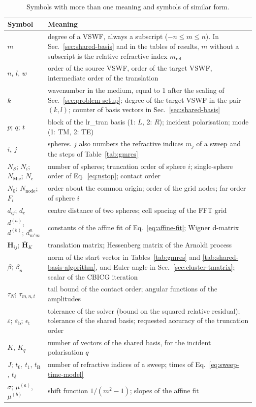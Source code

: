\documentclass[11pt,a4paper]{article}
\renewcommand{\arraystretch}{1.6}
\begin{document}
\begin{table}[htbp]
\caption{Symbols with more than one meaning and symbols of similar form.}
\label{tab:notation}
\centering
\renewcommand{\arraystretch}{1.15}
\begin{tabular}{@{} >{\raggedright\arraybackslash}p{3.6cm} >{\raggedright\arraybackslash}p{12.2cm} @{}}
\toprule
Symbol & Meaning \\
\midrule
$m$ & degree of a VSWF, always a subscript ($-n \leq m \leq n$). In Sec.~\ref{sec:shared-basis} and in the tables of results, $m$ without a subscript is the relative refractive index $m_\mathrm{rel}$ \\
$n$, $l$, $w$ & order of the source VSWF, order of the target VSWF, intermediate order of the translation \\
$k$ & wavenumber in the medium, equal to 1 after the scaling of Sec.~\ref{sec:problem-setup}; degree of the target VSWF in the pair $(k, l)$; counter of basis vectors in Sec.~\ref{sec:shared-basis} \\
$p$; $q$; $t$ & block of the lr\_tran basis (1: $L$, 2: $R$); incident polarisation; mode (1: TM, 2: TE) \\
$i$, $j$ & spheres. $j$ also numbers the refractive indices $m_j$ of a sweep and the steps of Table~\ref{tab:gmres} \\
$N_S$; $N_i$; $N_\mathrm{Mie}$; $N_\mathrm{c}$ & number of spheres; truncation order of sphere $i$; single-sphere order of Eq.~\eqref{eq:nstop}; contact order \\
$N_0$; $N_\mathrm{node}$; $F_i$ & order about the common origin; order of the grid nodes; far order of sphere $i$ \\
$d_{ij}$; $d_\mathrm{c}$ & centre distance of two spheres; cell spacing of the FFT grid \\
$d^{(a)}$, $d^{(b)}$; $d^n_{m'm}$ & constants of the affine fit of Eq.~\eqref{eq:affine-fit}; Wigner d-matrix \\
$\mathbf{H}_{ij}$; $\bar{\mathbf{H}}_K$ & translation matrix; Hessenberg matrix of the Arnoldi process \\
$\beta$; $\beta_n$ & norm of the start vector in Tables~\ref{tab:gmres} and \ref{tab:shared-basis-algorithm}, and Euler angle in Sec.~\ref{sec:cluster-tmatrix}; scalar of the CBICG iteration \\
$\tau_N$; $\tau_{m,n,t}$ & tail bound of the contact order; angular functions of the amplitudes \\
$\varepsilon$; $\varepsilon_\mathrm{b}$; $\epsilon_\mathrm{t}$ & tolerance of the solver (bound on the squared relative residual); tolerance of the shared basis; requested accuracy of the truncation order \\
$K$, $K_q$ & number of vectors of the shared basis, for the incident polarisation $q$ \\
$J$; $t_0$, $t_1$, $t_\mathrm{B}$, $t_\delta$ & number of refractive indices of a sweep; times of Eq.~\eqref{eq:sweep-time-model} \\
$\sigma$; $\mu^{(a)}$, $\mu^{(b)}$ & shift function $1/(m^2-1)$; slopes of the affine fit \\
\bottomrule
\end{tabular}
\end{table}
\end{document}
